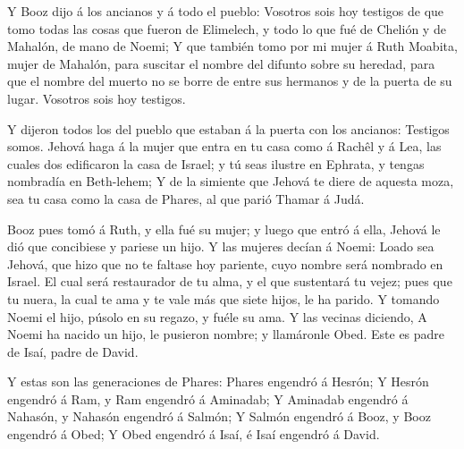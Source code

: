  Y Booz dijo á los ancianos y á todo el pueblo: Vosotros
sois hoy testigos de que tomo todas las cosas que fueron de Elimelech, y
todo lo que fué de Chelión y de Mahalón, de mano de Noemi; 
Y que también tomo por mi mujer á Ruth Moabita, mujer de Mahalón, para
suscitar el nombre del difunto sobre su heredad, para que el nombre del
muerto no se borre de entre sus hermanos y de la puerta de su lugar.
Vosotros sois hoy testigos.

 Y dijeron todos los del pueblo que estaban á la puerta con
los ancianos: Testigos somos. Jehová haga á la mujer que entra en tu
casa como á Rachêl y á Lea, las cuales dos edificaron la casa de Israel;
y tú seas ilustre en Ephrata, y tengas nombradía en Beth-lehem;
 Y de la simiente que Jehová te diere de aquesta moza, sea
tu casa como la casa de Phares, al que parió Thamar á Judá.

 Booz pues tomó á Ruth, y ella fué su mujer; y luego que
entró á ella, Jehová le dió que concibiese y pariese un hijo.
 Y las mujeres decían á Noemi: Loado sea Jehová, que hizo
que no te faltase hoy pariente, cuyo nombre será nombrado en Israel.
 El cual será restaurador de tu alma, y el que sustentará
tu vejez; pues que tu nuera, la cual te ama y te vale más que siete
hijos, le ha parido.  Y tomando Noemi el hijo, púsolo en su
regazo, y fuéle su ama.  Y las vecinas diciendo, A Noemi ha
nacido un hijo, le pusieron nombre; y llamáronle Obed. Este es padre de
Isaí, padre de David.

 Y estas son las generaciones de Phares: Phares engendró á
Hesrón;  Y Hesrón engendró á Ram, y Ram engendró á
Aminadab;  Y Aminadab engendró á Nahasón, y Nahasón
engendró á Salmón;  Y Salmón engendró á Booz, y Booz
engendró á Obed;  Y Obed engendró á Isaí, é Isaí engendró á
David.
